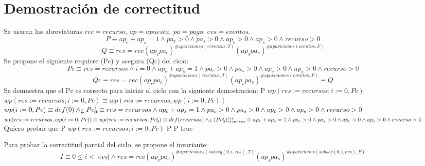 \documentclass[10pt,a4paper]{article}
\begin{document}
\section{Demostración de correctitud}

Se usaran las abreviaturas $rec = recurso$, $ap = apuesta$, $pa = pago$, $evs = eventos$.\\
\begin{equation*}
    P \equiv ap_c + ap_s = 1 \land pa_c > 0 \land pa_s > 0 \land ap_c > 0 \land ap_s > 0 \land recurso > 0
\end{equation*}
\begin{equation*}
    Q \equiv  res = rec (ap_c pa_c)^{\# apariciones(eeventos, T)}(ap_s pa_s)^{\#apariciones(eventos, F)}
\end{equation*}
Se propone el siguiente requiere (Pc) y asegura (Qc) del ciclo:
\begin{equation*}
    Pc \equiv res=recursos \land i=0 \land ap_c + ap_s = 1 \land pa_c > 0 \land pa_s > 0 \land ap_c > 0 \land ap_s > 0 \land recurso > 0
\end{equation*}
\begin{equation*}
    Qc \equiv res = rec (ap_c pa_c)^{\# apariciones(eeventos, T)}(ap_s pa_s)^{\#apariciones(eventos, F)} \equiv Q
\end{equation*}
Se demuestra que el Pc es correcto para iniciar el ciclo con la siguiente demostracion: \newline P \implica $wp(res:=recursos;i:=0,Pc)$ \newline $wp(res:=recursos;i:=0,Pc) \equiv wp(res:=recursos,wp(i:=0,Pc))$ \newline $wp(i:=0,Pc) \equiv def(0) \land _L Pc_{0}^i \equiv res=recursos \land ap_c + ap_s = 1 \land pa_c > 0 \land pa_s > 0 \land ap_c > 0 \land ap_s > 0 \land recurso > 0$ \newline $wp(res:=recursos,wp(i:=0,Pc)) \equiv wp(res:=recursos,Pc_{0}^i) \equiv def(recursos) \land _L (Pc_{0}^i)_{recursos}^{res} \equiv ap_c + ap_s = 1 \land pa_c > 0 \land pa_s > 0 \land ap_c > 0 \land ap_s > 0 \land recurso > 0$ \newline
Quiero probar que \newline P \implica $wp(res:=recursos;i:=0,Pc)$ \newline \equiv P \implica P \equiv true \newline

Para probar la correctitud parcial del ciclo, se propone el invariante:
\begin{equation*}
	I \equiv 0 \leq i < |evs| \wedge res = rec (ap_c pa_c)^{\# apariciones(subseq(0, i, evs), T)}(ap_s pa_s)^{\#apariciones(subseq(0, i, evs), F)}
\end{equation*}	
\end{document}
